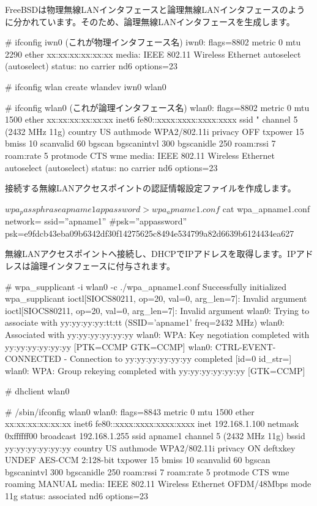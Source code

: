 \documentclass[mingoth,a4paper]{jsarticle}
\begin{document}
FreeBSDは物理無線LANインタフェースと論理無線LANインタフェースのように分かれています。そのため、論理無線LANインタフェースを生成します。

\begin{commandline}
  # ifconfig iwn0  (これが物理インタフェース名)
  iwn0: flags=8802 metric 0 mtu 2290
  ether xx:xx:xx:xx:xx:xx
  media: IEEE 802.11 Wireless Ethernet autoselect (autoselect)
  status: no carrier
  nd6 options=23

  # ifconfig wlan create wlandev iwn0
  wlan0

  # ifconfig wlan0 (これが論理インタフェース名)
  wlan0: flags=8802 metric 0 mtu 1500
  ether xx:xx:xx:xx:xx:xx
  inet6 fe80::xxxx:xxxx:xxxx:xxxx%
  ssid " channel 5 (2432 MHz 11g)
  country US authmode WPA2/802.11i privacy OFF txpower 15 bmiss 10
  scanvalid 60 bgscan bgscanintvl 300 bgscanidle 250 roam:rssi 7
  roam:rate 5 protmode CTS wme
  media: IEEE 802.11 Wireless Ethernet autoselect (autoselect)
  status: no carrier
      nd6 options=23
\end{commandline}

接続する無線LANアクセスポイントの認証情報設定ファイルを作成します。

\begin{commandline}
  $ wpa_passphrase apname1 appassword > wpa_apname1.conf
  $ cat wpa_apname1.conf
  network={
    ssid=''apname1''
    #psk=''appassword''
    psk=e9fdcb43eba09b6342df30f14275625c8494e534799a82d6639b6124434ea627
  }  
\end{commandline}

無線LANアクセスポイントへ接続し、DHCPでIPアドレスを取得します。IPアドレスは論理インタフェースに付与されます。

\begin{commandline}
  # wpa_supplicant -i wlan0 -c ./wpa_apname1.conf
  Successfully initialized wpa_supplicant
  ioctl[SIOCS80211, op=20, val=0, arg_len=7]: Invalid argument
  ioctl[SIOCS80211, op=20, val=0, arg_len=7]: Invalid argument
  wlan0: Trying to associate with yy:yy:yy:yy:tt:tt (SSID='apname1' freq=2432 MHz)
  wlan0: Associated with yy:yy:yy:yy:yy:yy
  wlan0: WPA: Key negotiation completed with yy:yy:yy:yy:yy:yy [PTK=CCMP GTK=CCMP]
  wlan0: CTRL-EVENT-CONNECTED - Connection to yy:yy:yy:yy:yy:yy completed [id=0 id_str=]
  wlan0: WPA: Group rekeying completed with yy:yy:yy:yy:yy:yy [GTK=CCMP]

  # dhclient wlan0

  # /sbin/ifconfig wlan0
  wlan0: flags=8843 metric 0 mtu 1500
  ether xx:xx:xx:xx:xx:xx
  inet6 fe80::xxxx:xxxx:xxxx:xxxx%
  inet 192.168.1.100 netmask 0xffffff00 broadcast 192.168.1.255
  ssid apname1 channel 5 (2432 MHz 11g) bssid yy:yy:yy:yy:yy:yy
  country US authmode WPA2/802.11i privacy ON deftxkey UNDEF
  AES-CCM 2:128-bit txpower 15 bmiss 10 scanvalid 60 bgscan
  bgscanintvl 300 bgscanidle 250 roam:rssi 7 roam:rate 5 protmode CTS
  wme roaming MANUAL
  media: IEEE 802.11 Wireless Ethernet OFDM/48Mbps mode 11g
  status: associated
          nd6 options=23
\end{commandline}
\end{document}
